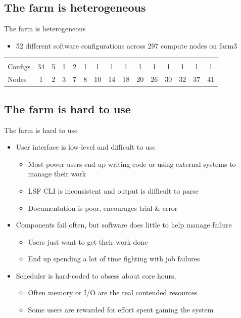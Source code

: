 \documentclass[xcolor=x11names,compress]{beamer}
\renewcommand{\(}{\begin{columns}}
\renewcommand{\)}{\end{columns}}
\newcommand{\<}[1]{\begin{column}{#1}}
\renewcommand{\>}{\end{column}}
\begin{document}
\subsection*{The farm is heterogeneous}
\begin{frame}{The farm is heterogeneous}
\dcbackground
\begin{shadedbox}[leftmargin=0,rightmargin=0]
\begin{itemize}
\item 52 different software configurations across 297 compute nodes on farm3
\end{itemize}
{\color{white}\setlength{\tabcolsep}{4pt}
	\begin{tabular}{ p{4em} | c c c c c c c c c c c c c c }
		& & & & & & & & & & & & & \\
		Configs & 34 & 5 & 1 & 2 & 1 & 1 & 1 & 1 & 1 & 1 & 1 & 1 & 1 & 1 \\
		\hline
		Nodes & 1 & 2 & 3 & 7 & 8 & 10 & 14 & 18 & 20 & 26 & 30 & 32 & 37 & 41 \\
	\end{tabular}
	}
\end{shadedbox}
\end{frame}

\subsection*{The farm is hard to use}
\begin{frame}{The farm is hard to use}
\dcbackground
\begin{shadedbox}[leftmargin=0,rightmargin=0]
\begin{itemize}
\item User interface is low-level and difficult to use
	\begin{itemize}
	\item Most power users end up writing code or using external systems to manage their work
	\item LSF CLI is inconsistent and output is difficult to parse
	\item Documentation is poor, encourages trial \& error
	\end{itemize}
\item Components fail often, but software does little to help manage failure
	\begin{itemize}
	\item Users just want to get their work done
	\item End up spending a lot of time fighting with job failures
	\end{itemize}
\item Scheduler is hard-coded to obsess about core hours,
	\begin{itemize}
	\item Often memory or I/O are the real contended resources
	\item Some users are rewarded for effort spent gaming the system
	\end{itemize}
\end{itemize}
\end{shadedbox}
\end{frame}
\end{document}
